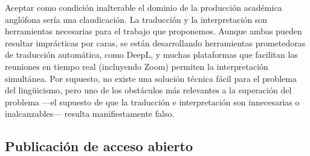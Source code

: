 \documentclass{tufte-handout}
\begin{document}
Aceptar como condición inalterable el dominio de la producción académica
anglófona sería una claudicación. La traducción y la interpretación son
herramientas necesarias para el trabajo que proponemos. Aunque ambas
pueden resultar imprácticas por caras, se están desarrollando
herramientas prometedoras de traducción automática, como DeepL, y muchas
plataformas que facilitan las reuniones en tiempo real (incluyendo Zoom)
permiten la interpretación simultánea. Por supuesto, no existe una
solución técnica fácil para el problema del lingüicismo, pero uno de los
obstáculos más relevantes a la superación del problema ---el supuesto de
que la traducción e interpretación son innecesarias o inalcanzables---
resulta manifiestamente falso.

\hypertarget{publicaciuxf3n-de-acceso-abierto}{%
\subsection{Publicación de acceso
abierto}\label{publicaciuxf3n-de-acceso-abierto}}
\end{document}
